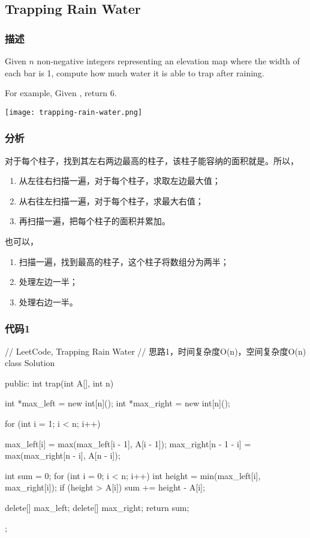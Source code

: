\subsection{Trapping Rain Water} %
\label{sec:trapping-rain-water}


\subsubsection{描述}
Given $n$ non-negative integers representing an elevation map where the width of each bar is 1, compute how much water it is able to trap after raining.

For example, 
Given \code{[0,1,0,2,1,0,1,3,2,1,2,1]}, return 6.

\begin{center}
\texttt{[image: trapping-rain-water.png]}\\
\label{fig:trapping-rain-water}
\end{center}


\subsubsection{分析}
对于每个柱子，找到其左右两边最高的柱子，该柱子能容纳的面积就是。所以，
\begin{enumerate}
\item 从左往右扫描一遍，对于每个柱子，求取左边最大值；
\item 从右往左扫描一遍，对于每个柱子，求最大右值；
\item 再扫描一遍，把每个柱子的面积并累加。
\end{enumerate}

也可以，
\begin{enumerate}
\item 扫描一遍，找到最高的柱子，这个柱子将数组分为两半；
\item 处理左边一半；
\item 处理右边一半。
\end{enumerate}


\subsubsection{代码1}
\begin{Code}
// LeetCode, Trapping Rain Water
// 思路1，时间复杂度O(n)，空间复杂度O(n)
class Solution {
public:
    int trap(int A[], int n) {
        int *max_left = new int[n]();
        int *max_right = new int[n]();

        for (int i = 1; i < n; i++) {
            max_left[i] = max(max_left[i - 1], A[i - 1]);
            max_right[n - 1 - i] = max(max_right[n - i], A[n - i]);

        }

        int sum = 0;
        for (int i = 0; i < n; i++) {
            int height = min(max_left[i], max_right[i]);
            if (height > A[i]) {
                sum += height - A[i];
            }
        }

        delete[] max_left;
        delete[] max_right;
        return sum;
    }
};
\end{Code}



